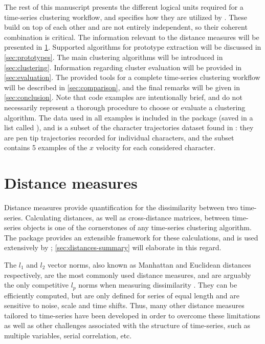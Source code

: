 The rest of this manuscript presents the different logical units required for a time-series clustering workflow,
and specifies how they are utilized by \dtwclust{}.
These build on top of each other and are not entirely independent,
so their coherent combination is critical.
The information relevant to the distance measures will be presented in \cref{sec:distances}.
Supported algorithms for prototype extraction will be discussed in \cref{sec:prototypes}.
The main clustering algorithms will be introduced in \cref{sec:clustering}.
Information regarding cluster evaluation will be provided in \cref{sec:evaluation}.
The provided tools for a complete time-series clustering workflow will be described in \cref{sec:comparison},
and the final remarks will be given in \cref{sec:conclusion}.
Note that code examples are intentionally brief,
and do not necessarily represent a thorough procedure to choose or evaluate a clustering algorithm.
The data used in all examples is included in the package (saved in a list called ),
and is a subset of the character trajectories dataset found in \citet{lichman2013}:
they are pen tip trajectories recorded for individual characters,
and the subset contains 5 examples of the $x$ velocity for each considered character.

\section{Distance measures}
\label{sec:distances}

Distance measures provide quantification for the dissimilarity between two time-series.
Calculating distances,
as well as cross-distance matrices,
between time-series objects is one of the cornerstones of any time-series clustering algorithm.
The  package \citep{proxy} provides an extensible framework for these calculations,
and is used extensively by \dtwclust{};
\cref{sec:distances-summary} will elaborate in this regard.

The $l_1$ and $l_2$ vector norms,
also known as Manhattan and Euclidean distances respectively,
are the most commonly used distance measures,
and are arguably the only competitive $l_p$ norms when measuring dissimilarity \citep{aggarwal2001, lemire2009}.
They can be efficiently computed,
but are only defined for series of equal length and are sensitive to noise,
scale and time shifts.
Thus, many other distance measures tailored to time-series have been developed in order to overcome these limitations as well as other challenges associated with the structure of time-series,
such as multiple variables,
serial correlation, etc.

